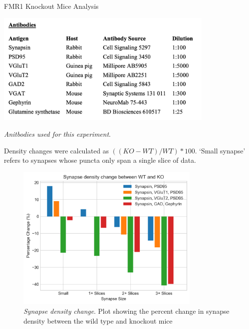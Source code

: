 \documentclass[final, table]{beamer}
\newlength{\onecolwid}
\begin{document}
\begin{frame}[t]
\begin{columns}[t]
\begin{column}{\onecolwid}
\begin{block}{FMR1 Knockout Mice Analysis}
\begin{table}
\centering
\includegraphics[width=0.8\textwidth]{figs/antibody_table}
\caption{\textit{Anitbodies used for this experiment}.  }
\end{table}



Density changes were calculated as $((KO-WT)/WT)*100$.  `Small synapse' refers to synapses whose puncta only span a single slice of data. 
\begin{figure}
\centering
\includegraphics[width=0.8\textwidth]{figs/Synapse_Density_Change}
\caption{\textit{Synapse density change}.  Plot showing the percent change in synapse density between the wild type and knockout mice }
\end{figure}



\end{block}
\end{column}
\end{columns}
\end{frame}
\end{document}
